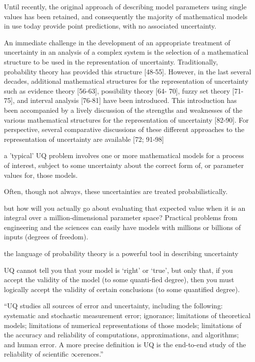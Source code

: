 
Until recently, the original approach of describing model parameters using single values has been retained, and consequently the majority of mathematical models in use today provide point predictions, with no associated uncertainty. \cite{Johnstone2015}

An immediate challenge in the development of an appropriate treatment of uncertainty in an analysis of a complex system is the selection of a mathematical structure to be used in the representation of uncertainty. \cite{Helton2010} Traditionally, probability theory has provided this structure [48-55]. However, in the last several decades, additional mathematical structures for the representation of uncertainty such as evidence theory [56-63], possibility theory [64- 70], fuzzy set theory [71-75], and interval analysis [76-81] have been introduced.
This introduction has been accompanied by a lively discussion of the strengths and weaknesses of the various mathematical structures for the representation of uncertainty [82-90]. For perspective, several comparative discussions of these different approaches to the representation of uncertainty are available [72; 91-98]

a 'typical' UQ problem involves one or more mathematical models for a process of interest, subject to some uncertainty about the correct form of, or parameter values for, those models. %

Often, though not always, these uncertainties are treated probabilistically. %

but how will you actually go about evaluating that expected value when it is an integral over a million-dimensional parameter space?
Practical problems from engineering and the sciences can easily have models with millions or billions of inputs
(degrees of freedom). %

the language of probability theory is a powerful tool in describing uncertainty %

UQ cannot tell you that your model is ‘right’ or ‘true’, but only that, if you accept the validity of the model (to some quanti-fied degree), then you must logically accept the validity of certain conclusions (to some quantified degree). \cite{Sullivan2015}

“UQ studies all sources of error and uncertainty, including the following: systematic and stochastic measurement error; ignorance; limitations of theoretical models; limitations of numerical representations of those models; limitations of the accuracy and reliability of computations, approximations, and algorithms; and human error. A more precise definition is UQ is the end-to-end study of the reliability of scientific
$\infty$erences.” %


